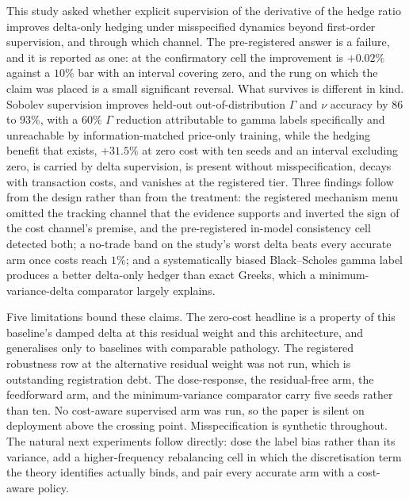\documentclass[10pt]{article}
\begin{document}
This study asked whether explicit supervision of the derivative of the hedge ratio
improves delta-only hedging under misspecified dynamics beyond first-order
supervision, and through which channel. The pre-registered answer is a failure, and
it is reported as one: at the confirmatory cell the improvement is $+0.02\%$ against
a $10\%$ bar with an interval covering zero, and the rung on which the claim was
placed is a small significant reversal. What survives is different in kind. Sobolev
supervision improves held-out out-of-distribution $\Gamma$ and $\nu$ accuracy by
$86$ to $93\%$, with a $60\%$ $\Gamma$ reduction attributable to gamma labels
specifically and unreachable by information-matched price-only training, while the
hedging benefit that exists, $+31.5\%$ at zero cost with ten seeds and an interval
excluding zero, is carried by delta supervision, is present without
misspecification, decays with transaction costs, and vanishes at the registered
tier. Three findings follow from the design rather than from the treatment: the
registered mechanism menu omitted the tracking channel that the evidence supports
and inverted the sign of the cost channel's premise, and the pre-registered in-model
consistency cell detected both; a no-trade band on the study's worst delta beats
every accurate arm once costs reach $1\%$; and a systematically biased
Black--Scholes gamma label produces a better delta-only hedger than exact Greeks,
which a minimum-variance-delta comparator largely explains.

Five limitations bound these claims. The zero-cost headline is a property of this
baseline's damped delta at this residual weight and this architecture, and
generalises only to baselines with comparable pathology. The registered robustness
row at the alternative residual weight was not run, which is outstanding
registration debt. The dose-response, the residual-free arm, the feedforward arm,
and the minimum-variance comparator carry five seeds rather than ten. No cost-aware
supervised arm was run, so the paper is silent on deployment above the crossing
point. Misspecification is synthetic throughout. The natural next experiments follow
directly: dose the label bias rather than its variance, add a higher-frequency
rebalancing cell in which the discretisation term the theory identifies actually
binds, and pair every accurate arm with a cost-aware policy.
\end{document}
